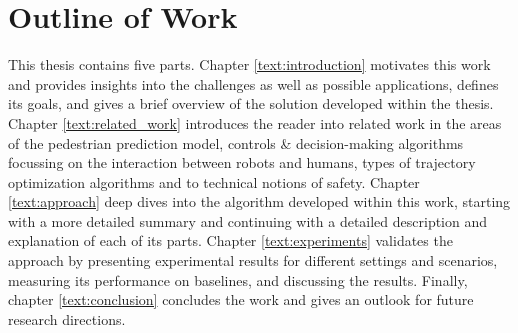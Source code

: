 \section{Outline of Work}
\label{text:introduction/outline}
This thesis contains five parts. Chapter \ref{text:introduction} motivates this work and provides insights into the challenges as well as possible applications, defines its goals, and gives a brief overview of the solution developed within the thesis. Chapter \ref{text:related_work} introduces the reader into related work in the areas of the pedestrian prediction model, controls \& decision-making algorithms focussing on the interaction between robots and humans, types of trajectory optimization algorithms and to technical notions of safety. Chapter \ref{text:approach} deep dives into the algorithm developed within this work, starting with a more detailed summary and continuing with a detailed description and explanation of each of its parts. Chapter \ref{text:experiments} validates the approach by presenting experimental results for different settings and scenarios, measuring its performance on baselines, and discussing the results. Finally, chapter \ref{text:conclusion} concludes the work and gives an outlook for future research directions.
